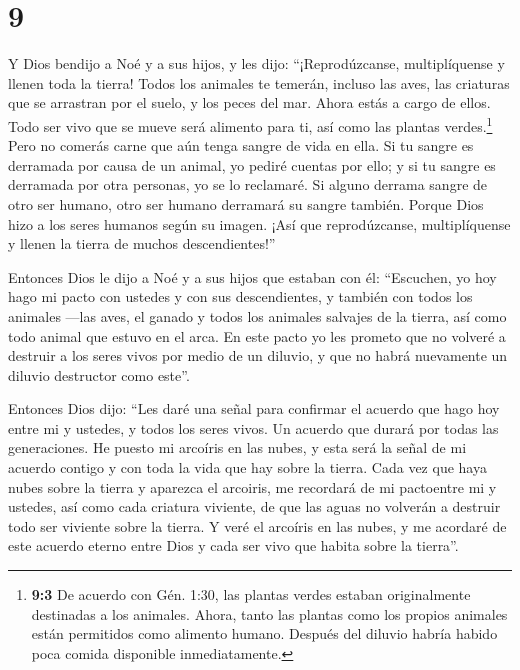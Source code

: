 \hypertarget{section-8}{%
\section{9}\label{section-8}}

 Y Dios bendijo a Noé y a sus hijos, y les dijo:
``¡Reprodúzcanse, multiplíquense y llenen toda la tierra! 
Todos los animales te temerán, incluso las aves, las criaturas que se
arrastran por el suelo, y los peces del mar. Ahora estás a cargo de
ellos.  Todo ser vivo que se mueve será alimento para ti,
así como las plantas verdes.\footnote{\textbf{9:3} De acuerdo con Gén.
  1:30, las plantas verdes estaban originalmente destinadas a los
  animales. Ahora, tanto las plantas como los propios animales están
  permitidos como alimento humano. Después del diluvio habría habido
  poca comida disponible inmediatamente.}  Pero no comerás
carne que aún tenga sangre de vida en ella.  Si tu sangre es
derramada por causa de un animal, yo pediré cuentas por ello; y si tu
sangre es derramada por otra personas, yo se lo reclamaré. 
Si alguno derrama sangre de otro ser humano, otro ser humano derramará
su sangre también. Porque Dios hizo a los seres humanos según su imagen.
 ¡Así que reprodúzcanse, multiplíquense y llenen la tierra
de muchos descendientes!''

 Entonces Dios le dijo a Noé y a sus hijos que estaban con
él:  ``Escuchen, yo hoy hago mi pacto con ustedes y con sus
descendientes,  y también con todos los animales ---las
aves, el ganado y todos los animales salvajes de la tierra, así como
todo animal que estuvo en el arca.  En este pacto yo les
prometo que no volveré a destruir a los seres vivos por medio de un
diluvio, y que no habrá nuevamente un diluvio destructor como este''.

 Entonces Dios dijo: ``Les daré una señal para confirmar el
acuerdo que hago hoy entre mi y ustedes, y todos los seres vivos. Un
acuerdo que durará por todas las generaciones.  He puesto
mi arcoíris en las nubes, y esta será la señal de mi acuerdo contigo y
con toda la vida que hay sobre la tierra.  Cada vez que
haya nubes sobre la tierra y aparezca el arcoiris,  me
recordará de mi pactoentre mi y ustedes, así como cada criatura
viviente, de que las aguas no volverán a destruir todo ser viviente
sobre la tierra.  Y veré el arcoíris en las nubes, y me
acordaré de este acuerdo eterno entre Dios y cada ser vivo que habita
sobre la tierra''.

